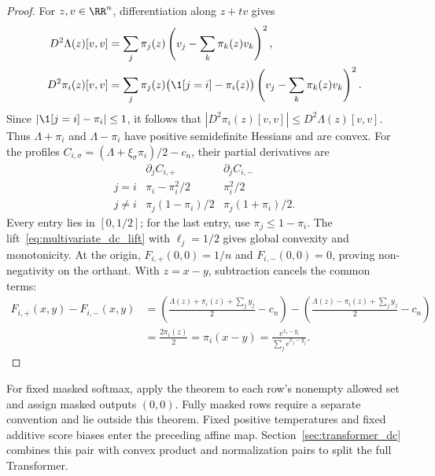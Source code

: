 \begin{proof}
For $z,v\in\RR^n$, differentiation along $z+tv$ gives
\begin{equation}
\begin{aligned}
    D^2\Lambda(z)[v,v]
    &=\sum_j\pi_j(z)\left(v_j-\sum_k\pi_k(z)v_k\right)^2,\\
    D^2\pi_i(z)[v,v]
    &=\sum_j\pi_j(z)\bigl(\1[j=i]-\pi_i(z)\bigr)
      \left(v_j-\sum_k\pi_k(z)v_k\right)^2.
\end{aligned}
    \label{eq:softmax_curvature_domination}
\end{equation}
Since $|\1[j=i]-\pi_i|\le1$, it follows that
$|D^2\pi_i(z)[v,v]|\le D^2\Lambda(z)[v,v]$. Thus $\Lambda+\pi_i$ and $\Lambda-\pi_i$ have positive semidefinite Hessians and are convex. For the profiles $C_{i,\sigma}=(\Lambda+\xi_\sigma\pi_i)/2-c_n$, their partial derivatives are
\begin{equation}
\begin{array}{c|cc}
 & \partial_j C_{i,+} & \partial_j C_{i,-}\\ \hline
 j=i & \pi_i-\pi_i^2/2 & \pi_i^2/2\\
 j\ne i & \pi_j(1-\pi_i)/2 & \pi_j(1+\pi_i)/2.
\end{array}
    \label{eq:softmax_profile_gradients}
\end{equation}
Every entry lies in $[0,1/2]$; for the last entry, use $\pi_j\le1-\pi_i$. The lift~\eqref{eq:multivariate_dc_lift} with $\ell_j=1/2$ gives global convexity and monotonicity. At the origin, $F_{i,+}(0,0)=1/n$ and $F_{i,-}(0,0)=0$, proving non-negativity on the orthant. With $z=x-y$, subtraction cancels the common terms:
\begin{align*}
F_{i,+}(x,y)-F_{i,-}(x,y)
&=\left(\frac{\Lambda(z)+\pi_i(z)+\sum_j y_j}{2}-c_n\right)
 -\left(\frac{\Lambda(z)-\pi_i(z)+\sum_j y_j}{2}-c_n\right)\\
&=\frac{2\pi_i(z)}{2}=\pi_i(x-y)
 =\frac{e^{x_i-y_i}}{\sum_j e^{x_j-y_j}}.
\end{align*}
\end{proof}

For fixed masked softmax, apply the theorem to each row's nonempty allowed set and assign masked outputs $(0,0)$. Fully masked rows require a separate convention and lie outside this theorem. Fixed positive temperatures and fixed additive score biases enter the preceding affine map. Section~\ref{sec:transformer_dc} combines this pair with convex product and normalization pairs to split the full Transformer.

